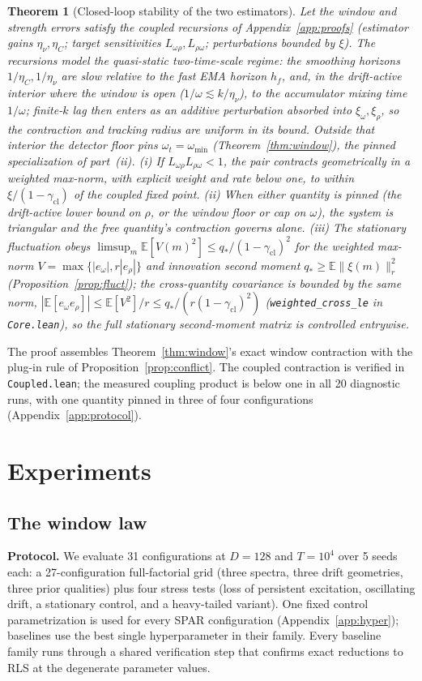 \documentclass[10pt]{article}
\newtheorem{theorem}{Theorem}
\newcommand{\E}{\mathbb{E}}
\begin{document}
\begin{theorem}[Closed-loop stability of the two estimators]
\label{thm:closedloop}
Let the window and strength errors satisfy the coupled recursions of Appendix~\ref{app:proofs} (estimator gains $\eta_\nu, \eta_C$; target sensitivities $L_{\omega\rho}, L_{\rho\omega}$; perturbations bounded by $\xi$).
The recursions model the quasi-static two-time-scale regime: the smoothing horizons $1/\eta_C, 1/\eta_\nu$ are slow relative to the fast EMA horizon $h_f$, and, in the drift-active interior where the window is open ($1/\omega \lesssim k/\eta_\nu$), to the accumulator mixing time $1/\omega$; finite-$k$ lag then enters as an additive perturbation absorbed into $\xi_\omega,\xi_\rho$, so the contraction and tracking radius are uniform in its bound. Outside that interior the detector floor pins $\omega_t = \omega_{\min}$ (Theorem~\ref{thm:window}), the pinned specialization of part~(ii).
(i) If $L_{\omega\rho} L_{\rho\omega} < 1$, the pair contracts geometrically in a weighted max-norm, with explicit weight and rate below one, to within $\xi/(1-\gamma_{\mathrm{cl}})$ of the coupled fixed point.
(ii) When either quantity is pinned (the drift-active lower bound on $\rho$, or the window floor or cap on $\omega$), the system is triangular and the free quantity's contraction governs alone.
(iii) The stationary fluctuation obeys $\limsup_m \E[V(m)^2] \le q_*/(1 - \gamma_{\mathrm{cl}})^2$ for the weighted max-norm $V = \max\{|e_\omega|, r|e_\rho|\}$ and innovation second moment $q_* \ge \E\|\xi(m)\|_r^2$ (Proposition~\ref{prop:fluct}); the cross-quantity covariance is bounded by the same norm, $|\E[e_\omega e_\rho]| \le \E[V^2]/r \le q_*/(r(1-\gamma_{\mathrm{cl}})^2)$ (\texttt{weighted\_cross\_le} in \texttt{Core.lean}), so the full stationary second-moment matrix is controlled entrywise.
\end{theorem}
The proof assembles Theorem~\ref{thm:window}'s exact window contraction with the plug-in rule of Proposition~\ref{prop:conflict}. The coupled contraction is verified in \texttt{Coupled.lean}; the measured coupling product is below one in all 20 diagnostic runs, with one quantity pinned in three of four configurations (Appendix~\ref{app:protocol}).

\section{Experiments}
\label{sec:experiments}

\subsection{The window law}
\textbf{Protocol.}
We evaluate 31 configurations at $D = 128$ and $T = 10^4$ over 5 seeds each: a 27-configuration full-factorial grid (three spectra, three drift geometries, three prior qualities) plus four stress tests (loss of persistent excitation, oscillating drift, a stationary control, and a heavy-tailed variant).
One fixed control parametrization is used for every SPAR configuration (Appendix~\ref{app:hyper}); baselines use the best single hyperparameter in their family.
Every baseline family runs through a shared verification step that confirms exact reductions to RLS at the degenerate parameter values.
\end{document}
